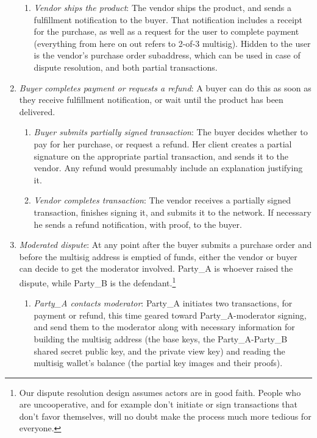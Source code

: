 \begin{enumerate}
\begin{enumerate}
        \item {\em Vendor ships the product}: The vendor ships the product, and sends a fulfillment notification to the buyer. That notification includes a receipt for the purchase, as well as a request for the user to complete payment (everything from here on out refers to 2-of-3 multisig). Hidden to the user is the vendor's purchase order subaddress, which can be used in case of dispute resolution, and both partial transactions.
    \end{enumerate}{}
    \item {\em Buyer completes payment or requests a refund}: A buyer can do this as soon as they receive fulfillment notification, or wait until the product has been delivered.
    \begin{enumerate}
        \item {\em Buyer submits partially signed transaction}: The buyer decides whether to pay for her purchase, or request a refund. Her client creates a partial signature on the appropriate partial transaction, and sends it to the vendor. Any refund would presumably include an explanation justifying it.
        \item {\em Vendor completes transaction}: The vendor receives a partially signed transaction, finishes signing it, and submits it to the network. If necessary he sends a refund notification, with proof, to the buyer.
    \end{enumerate}{}
    \item {\em Moderated dispute}: At any point after the buyer submits a purchase order and before the multisig address is emptied of funds, either the vendor or buyer can decide to get the moderator involved. Party\_A is whoever raised the dispute, while Party\_B is the defendant.\footnote{Our dispute resolution design assumes actors are in good faith. People who are uncooperative, and for example don't initiate or sign transactions that don't favor themselves, will no doubt make the process much more tedious for everyone.}
    \begin{enumerate}
        \item {\em Party\_A contacts moderator}: Party\_A initiates two transactions, for payment or refund, this time geared toward Party\_A-moderator signing, and send them to the moderator along with necessary information for building the multisig address (the base keys, the Party\_A-Party\_B shared secret public key, and the private view key) and reading the multisig wallet's balance (the partial key images and their proofs).

\end{enumerate}
\end{enumerate}
